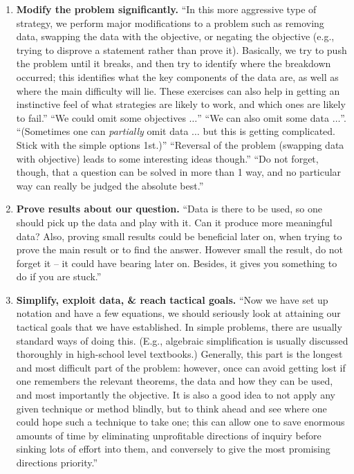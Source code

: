 \documentclass{article}
\numberwithin{equation}{section}
\begin{document}
\begin{enumerate}
	\item \textbf{Modify the problem significantly.} ``In this more aggressive type of strategy, we perform major modifications to a problem such as removing data, swapping the data with the objective, or negating the objective (e.g., trying to disprove a statement rather than prove it). Basically, we try to push the problem until it breaks, and then try to identify where the breakdown occurred; this identifies what the key components of the data are, as well as where the main difficulty will lie. These exercises can also help in getting an instinctive feel of what strategies are likely to work, and which ones are likely to fail.'' ``We could omit some objectives $\ldots$'' ``We can also omit some data $\ldots$''. ``(Sometimes one can \textit{partially} omit data $\ldots$ but this is getting complicated. Stick with the simple options 1st.)'' ``Reversal of the problem (swapping data with objective) leads to some interesting ideas though.'' ``Do not forget, though, that a question can be solved in more than 1 way, and no particular way can really be judged the absolute best.''
	\item \textbf{Prove results about our question.} ``Data is there to be used, so one should pick up the data and play with it. Can it produce more meaningful data? Also, proving small results could be beneficial later on, when trying to prove the main result or to find the answer. However small the result, do not forget it -- it could have bearing later on. Besides, it gives you something to do if you are stuck.''
	\item \textbf{Simplify, exploit data, \& reach tactical goals.} ``Now we have set up notation and have a few equations, we should seriously look at attaining our tactical goals that we have established. In simple problems, there are usually standard ways of doing this. (E.g., algebraic simplification is usually discussed thoroughly in high-school level textbooks.) Generally, this part is the longest and most difficult part of the problem: however, once can avoid getting lost if one remembers the relevant theorems, the data and how they can be used, and most importantly the objective. It is also a good idea to not apply any given technique or method blindly, but to think ahead and see where one could hope such a technique to take one; this can allow one to save enormous amounts of time by eliminating unprofitable directions of inquiry before sinking lots of effort into them, and conversely to give the most promising directions priority.''
\end{enumerate}
\end{document}
